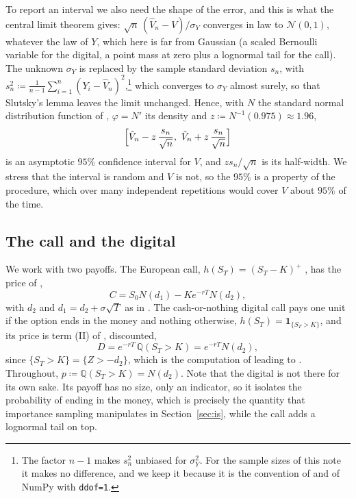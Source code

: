 \documentclass[11pt,a4paper]{article}
\theoremstyle{plain}
\theoremstyle{definition}
\theoremstyle{remark}
\newcommand{\Q}{\mathbb{Q}}
\newcommand{\1}{\mathbf{1}}
\newcommand{\eqdef}{\coloneqq}
\begin{document}
To report an interval we also need the shape of the error, and this is what the central limit theorem gives: $\sqrt n\,(\hat V_n - V)/\sigma_Y$ converges in law to $\mathcal N(0,1)$, whatever the law of $Y$, which here is far from Gaussian (a scaled Bernoulli variable for the digital, a point mass at zero plus a lognormal tail for the call). The unknown $\sigma_Y$ is replaced by the sample standard deviation $s_n$, with $s_n^2 \eqdef \frac{1}{n-1}\sum_{i=1}^n (Y_i - \hat V_n)^2$,\footnote{The factor $n - 1$ makes $s_n^2$ unbiased for $\sigma_Y^2$. For the sample sizes of this note it makes no difference, and we keep it because it is the convention of \cite{portfolio} and of NumPy with \texttt{ddof=1}.} which converges to $\sigma_Y$ almost surely, so that Slutsky's lemma leaves the limit unchanged. Hence, with $N$ the standard normal distribution function of \cite[\S 5.3]{tfg}, $\varphi = N'$ its density and $z \eqdef N^{-1}(0.975) \approx 1.96$,
\begin{equation}\label{eq:ci}
  \Bigl[\hat V_n - z\,\frac{s_n}{\sqrt n},\ \hat V_n + z\,\frac{s_n}{\sqrt n}\Bigr]
\end{equation}
is an asymptotic $95\%$ confidence interval for $V$, and $z s_n/\sqrt n$ is its half-width. We stress that the interval is random and $V$ is not, so the $95\%$ is a property of the procedure, which over many independent repetitions would cover $V$ about $95\%$ of the time.

\subsection{The call and the digital}

We work with two payoffs. The European call, $h(S_T) = (S_T - K)^+$ \cite[(5.24)]{tfg}, has the price of \cite[Thm~5.8]{tfg},
\begin{equation}\label{eq:call}
  C = S_0 N(d_1) - K e^{-rT} N(d_2),
\end{equation}
with $d_2$ and $d_1 = d_2 + \sigma\sqrt T$ as in \cite[(5.27)--(5.28)]{tfg}. The cash-or-nothing digital call pays one unit if the option ends in the money and nothing otherwise, $h(S_T) = \1_{\{S_T > K\}}$, and its price is term (II) of \cite[(5.25)]{tfg}, discounted,
\begin{equation}\label{eq:digital}
  D = e^{-rT}\,\Q(S_T > K) = e^{-rT} N(d_2),
\end{equation}
since $\{S_T > K\} = \{Z > -d_2\}$, which is the computation of \cite[\S 5.3]{tfg} leading to \cite[(5.27)]{tfg}. Throughout, $p \eqdef \Q(S_T > K) = N(d_2)$. Note that the digital is not there for its own sake. Its payoff has no size, only an indicator, so it isolates the probability of ending in the money, which is precisely the quantity that importance sampling manipulates in Section~\ref{sec:is}, while the call adds a lognormal tail on top.
\end{document}

